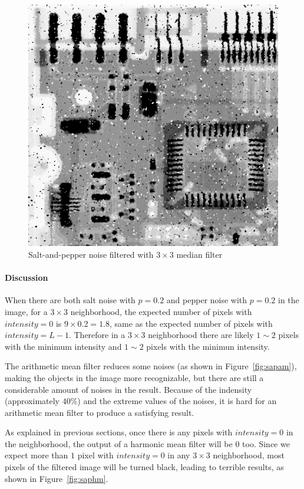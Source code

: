 \documentclass{article}
\begin{document}
\begin{figure}[H]
	\centering
	\includegraphics[width=336pt]{../result/task2/sap/sap-median.png}
	\caption{Salt-and-pepper noise filtered with $3 \times 3$ median filter}
	\label{fig:sapmedian}
\end{figure}

\paragraph{Discussion}

When there are both salt noise with $p = 0.2$ and pepper noise with $p = 0.2$ in the image, for a $3 \times 3$ neighborhood, the expected number of pixels with $intensity = 0$ is $9 \times 0.2 = 1.8$, same as the expected number of pixels with $intensity = L - 1$. Therefore in a $3 \times 3$ neighborhood there are likely $1 \sim 2$ pixels with the minimum intensity and $1 \sim 2$ pixels with the minimun intensity.

The arithmetic mean filter reduces some noises (as shown in Figure~\ref{fig:sapam}), making the objects in the image more recognizable, but there are still a considerable amount of noises in the result. Because of the indensity (approximately $40\%$) and the extreme values of the noises, it is hard for an arithmetic mean filter to produce a satisfying result.

As explained in previous sections, once there is any pixels with $intensity = 0$ in the neighborhood, the output of a harmonic mean filter will be $0$ too. Since we expect more than $1$ pixel with $intensity = 0$ in any $3 \times 3$ neighborhood, most pixels of the filtered image will be turned black, leading to terrible results, as shown in Figure~\ref{fig:saphm}.
\end{document}
